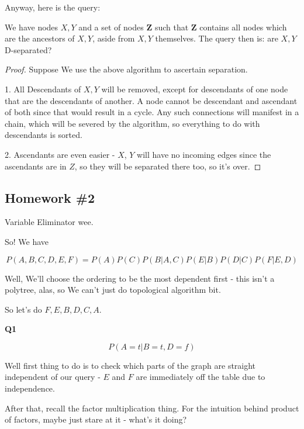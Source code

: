 \documentclass{article}
\begin{document}
		Anyway, here is the query:
		
		We have nodes $X, Y$ and a set of nodes $\mathbf{Z}$ such that $\mathbf{Z}$ contains all nodes which are the ancestors of $X, Y$, aside from $X, Y$ themselves. The query then is: are $X, Y$ D-separated?
		
		\begin{proof}
			Suppose We use the above algorithm to ascertain separation. 
			
			1. All Descendants of $X, Y$ will be removed, except for descendants of one node that are the descendants of another. A node cannot be descendant and ascendant of both since that would result in a cycle. Any such connections will manifest in a chain, which will be severed by the algorithm, so everything to do with descendants is sorted.
			
			2. Ascendants are even easier - $X$, $Y$ will have no incoming edges since the ascendants are in $Z$, so they will be separated there too, so it's over.
		\end{proof} 

	\newpage
	\subsection*{Homework \#2}
	
		Variable Eliminator wee.
		
		So! We have 
		
		\begin{equation}
			P(A, B, C, D, E, F) = P(A)P(C)P(B|A, C)P(E|B)P(D|C)P(F|E, D)
		\end{equation}	
			
		Well, We'll choose the ordering to be the most dependent first - this isn't a polytree, alas, so We can't just do topological algorithm bit.
		
		So let's do $F, E, B, D, C, A$.
		
		\textbf{Q1}
		
			\begin{equation}
				P(A=t|B=t, D=f)
			\end{equation}
			
			Well first thing to do is to check which parts of the graph are straight independent of our query - $E$ and $F$ are immediately off the table due to independence.
			
			After that, recall the factor multiplication thing. For the intuition behind product of factors, maybe just stare at it - what's it doing? 
			
\end{document}
